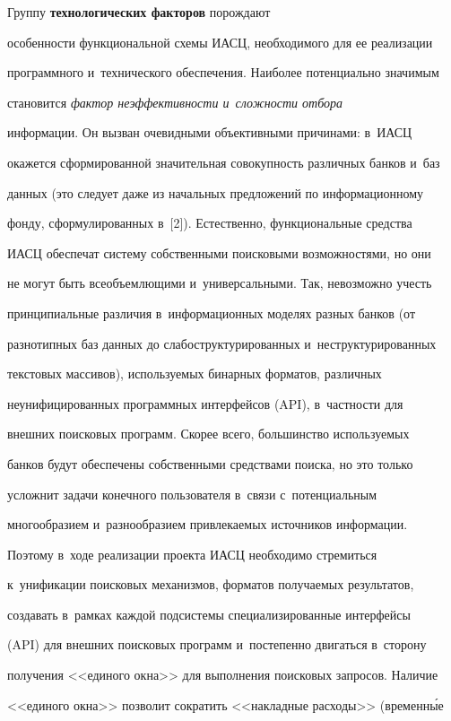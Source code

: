      


     Группу \textbf{технологических факторов} порождают 


особенности функциональной схемы ИАСЦ, необходимого для ее реализации 


программного и~технического обеспечения. Наиболее потенциально значимым 


становится \textit{фактор неэффективности и~сложности отбора} 


информации. Он вызван очевидными объективными причинами: в~ИАСЦ 


окажется сформированной значительная совокупность различных банков и~баз 


данных (это следует даже из начальных предложений по информационному 


фонду, сформулированных в~[2]). Естественно, функциональные средства 


ИАСЦ обеспечат систему собственными поисковыми возможностями, но они 


не могут быть всеобъемлющими и~универсальными. Так, невозможно учесть 


принципиальные различия в~информационных моделях разных банков (от 


разнотипных баз данных до слабоструктурированных и~неструктурированных 


текстовых массивов), используемых бинарных форматов, различных 


неунифицированных программных интерфейсов (API), в~частности для 


внешних поисковых программ. Скорее всего, большинство ис\-поль\-зу\-емых 


банков будут обеспечены собственными средствами поиска, но это только 


усложнит задачи конечного пользователя в~связи с~потенциальным 


многообразием и~разнообразием привлекаемых источников информации. 


Поэтому в~ходе реализации проекта ИАСЦ необходимо стремиться 


к~унификации поисковых механизмов, форматов получаемых результатов, 


создавать в~рамках каждой подсистемы специализированные интерфейсы 


(API) для внешних поисковых программ и~постепенно двигаться в~сторону 


получения <<единого окна>> для выполнения поисковых запросов. Наличие 


<<единого окна>> позволит сократить <<накладные расходы>> (временн\'{ы}е 


